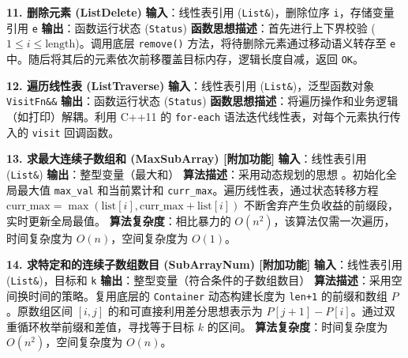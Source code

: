 \documentclass[supercite]{Experimental_Report}
\theoremstyle{definition}
\begin{document}
\vspace{0.5em}
\noindent\textbf{11. 删除元素 (ListDelete)}
\newline\textbf{输入}：线性表引用 (\texttt{List\&})，删除位序 \texttt{i}，存储变量引用 \texttt{e}
\newline\textbf{输出}：函数运行状态 (\texttt{Status})
\newline\textbf{函数思想描述}：首先进行上下界校验 ($1 \le i \le \mathrm{length}$)。调用底层 \texttt{remove()} 方法，将待删除元素通过移动语义转存至 \texttt{e} 中。随后将其后的元素依次前移覆盖目标内存，逻辑长度自减，返回 \texttt{OK}。

\vspace{0.5em}
\noindent\textbf{12. 遍历线性表 (ListTraverse)}
\newline\textbf{输入}：线性表引用 (\texttt{List\&})，泛型函数对象 \texttt{VisitFn\&\&}
\newline\textbf{输出}：函数运行状态 (\texttt{Status})
\newline\textbf{函数思想描述}：将遍历操作和业务逻辑（如打印）解耦。利用 C++11 的 \texttt{for-each} 语法迭代线性表，对每个元素执行传入的 \texttt{visit} 回调函数。

\vspace{0.5em}
\noindent\textbf{13. 求最大连续子数组和 (MaxSubArray) [附加功能]}
\newline\textbf{输入}：线性表引用 (\texttt{List\&})
\newline\textbf{输出}：整型变量（最大和）
\newline\textbf{算法描述}：采用动态规划的思想 \cite{cormen2009introduction}。初始化全局最大值 \texttt{max\_val} 和当前累计和 \texttt{curr\_max}。遍历线性表，通过状态转移方程 $\mathrm{curr\_max} = \max(\mathrm{list}[i], \mathrm{curr\_max} + \mathrm{list}[i])$ 不断舍弃产生负收益的前缀段，实时更新全局最值。
\newline\textbf{算法复杂度}：相比暴力的 $O(n^2)$，该算法仅需一次遍历，时间复杂度为 $O(n)$，空间复杂度为 $O(1)$。

\vspace{0.5em}
\noindent\textbf{14. 求特定和的连续子数组数目 (SubArrayNum) [附加功能]}
\newline\textbf{输入}：线性表引用 (\texttt{List\&})，目标和 \texttt{k}
\newline\textbf{输出}：整型变量（符合条件的子数组数目）
\newline\textbf{算法描述}：采用空间换时间的策略。复用底层的 \texttt{Container} 动态构建长度为 \texttt{len+1} 的前缀和数组 $P$。原数组区间 $[i, j]$ 的和可直接利用差分思想表示为 $P[j+1] - P[i]$。通过双重循环枚举前缀和差值，寻找等于目标 $k$ 的区间。
\newline\textbf{算法复杂度}：时间复杂度为 $O(n^2)$，空间复杂度为 $O(n)$。
\end{document}
